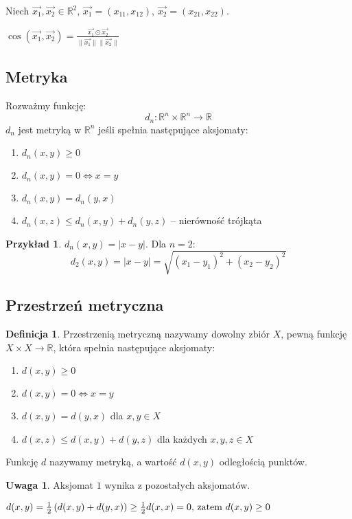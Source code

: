 \documentclass{article}
\theoremstyle{definition}
\newtheorem{de}{Definicja}[subsection]
\theoremstyle{definition}
\theoremstyle{definition}
\newtheorem{pk}{Przykład}[subsection]
\theoremstyle{definition}
\theoremstyle{definition}
\theoremstyle{definition}
\newtheorem*{uw}{Uwaga}
\theoremstyle{definition}
\begin{document}
Niech \( \overrightarrow{x_1}, \overrightarrow{x_2} \in \mathbb{R}^2 \),
\( \overrightarrow{x_1} = (x_{11}, x_{12}) \),
\( \overrightarrow{x_2} = (x_{21}, x_{22}) \).

\begin{center}
    \( \cos(\overrightarrow{x_1}, \overrightarrow{x_2}) = \frac{\overrightarrow{x_1} \odot \overrightarrow{x_2}}{\|\overrightarrow{x_1}\| \|\overrightarrow{x_2}\|} \)
\end{center}

\subsection{Metryka}
Rozważmy funkcję:
\[ d_n: \mathbb{R}^n \times \mathbb{R}^n \rightarrow \mathbb{R} \]
\(d_n\) jest metryką w \(\mathbb{R}^n\) jeśli spełnia następujące aksjomaty:
\begin{enumerate}
    \item \( d_n(x,y) \geq 0 \)
    \item \( d_n(x,y) = 0 \iff x=y \)
    \item \( d_n(x,y) = d_n(y,x) \)
    \item \( d_n(x,z) \leq d_n(x,y) + d_n(y,z) \) -- nierówność trójkąta
\end{enumerate}

\begin{pk}
    \( d_n(x,y) = |x-y| \).
    Dla \( n=2 \):
    \[
        d_2(x,y) = |x-y| = \sqrt{(x_1-y_1)^2 + (x_2-y_2)^2}
    \]
\end{pk}

\subsection{Przestrzeń metryczna}

\begin{de}
Przestrzenią metryczną nazywamy dowolny zbiór $X$, pewną funkcję $X\times X \rightarrow \mathbb{R}$,
która spełnia następujące aksjomaty:
\begin{enumerate}
    \item $d(x,y)\geq 0$
    \item $d(x,y)=0 \iff x=y$
    \item $d(x,y)=d(y,x)$ dla $x,y\in X$
    \item $d(x,z)\leq d(x,y) + d(y,z)$ dla każdych $x,y,z \in X$
\end{enumerate}
Funkcję $d$ nazywamy metryką, a wartość $d(x,y)$ odległością punktów.

\end{de}
\begin{uw}
    Aksjomat $1$ wynika z pozostałych aksjomatów.
\end{uw}
\(
    d(x,y) = \frac{1}{2} \left(d(x,y)+d(y,x)\right) \geq \frac{1}{2} d(x,x) = 0$, zatem $d(x,y)\geq 0
\)
\end{document}
